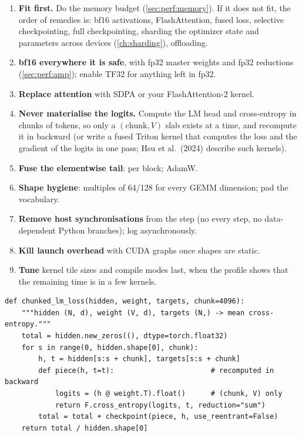 \begin{enumerate}
\item \textbf{Fit first.} Do the memory budget (\cref{sec:perf:memory}). If it does not fit, the
  order of remedies is: bf16 activations, FlashAttention, fused loss, selective checkpointing, full
  checkpointing, sharding the optimizer state and parameters across devices (\cref{ch:sharding}),
  offloading.
\item \textbf{bf16 everywhere it is safe}, with fp32 master weights and fp32 reductions
  (\cref{sec:perf:amp}); enable TF32 for anything left in fp32.
\item \textbf{Replace attention} with SDPA or your FlashAttention-2 kernel.
\item \textbf{Never materialise the logits.} Compute the LM head and cross-entropy in chunks of
  tokens, so only a $(\text{chunk}, V)$ slab exists at a time, and recompute it in backward (or
  write a fused Triton kernel that computes the loss and the gradient of the logits in one pass;
  Hsu et al.\ (2024) describe such kernels).
\item \textbf{Fuse the elementwise tail}:  per block;  AdamW.
\item \textbf{Shape hygiene}: multiples of 64/128 for every GEMM dimension; pad the vocabulary.
\item \textbf{Remove host synchronisations} from the step (no  every step, no
  data-dependent Python branches); log asynchronously.
\item \textbf{Kill launch overhead} with CUDA graphs once shapes are static.
\item \textbf{Tune} kernel tile sizes and compile modes last, when the profile shows that the
  remaining time is in a few kernels.
\end{enumerate}

\begin{lstlisting}[caption={Chunked LM head plus cross-entropy: peak logits memory is one chunk.},label={lst:perf:chunkce}]
def chunked_lm_loss(hidden, weight, targets, chunk=4096):
    """hidden (N, d), weight (V, d), targets (N,) -> mean cross-entropy."""
    total = hidden.new_zeros((), dtype=torch.float32)
    for s in range(0, hidden.shape[0], chunk):
        h, t = hidden[s:s + chunk], targets[s:s + chunk]
        def piece(h, t=t):                       # recomputed in backward
            logits = (h @ weight.T).float()      # (chunk, V) only
            return F.cross_entropy(logits, t, reduction="sum")
        total = total + checkpoint(piece, h, use_reentrant=False)
    return total / hidden.shape[0]
\end{lstlisting}

